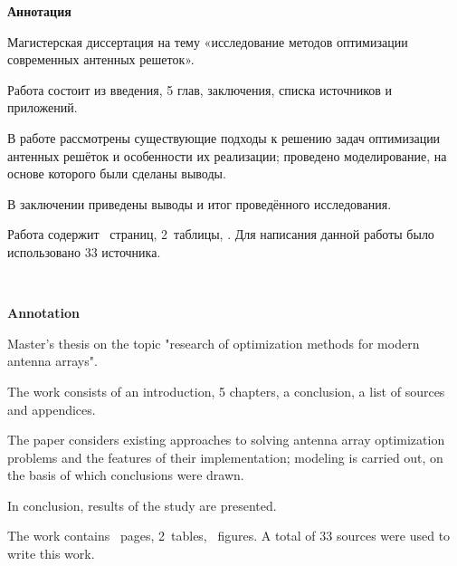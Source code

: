 {\Large\normalfont\bfseries \hfil Аннотация}
\vspace{1em}
\thispagestyle{empty}

Магистерская диссертация на тему «исследование методов оптимизации современных антенных решеток».

Работа состоит из введения, 5 глав, заключения, списка источников и приложений.

В работе рассмотрены существующие подходы к решению задач оптимизации антенных решёток и 
особенности их реализации; проведено моделирование, на основе которого были сделаны выводы.

В заключении приведены выводы и итог проведённого исследования.

Работа содержит~\pageref*{LastPage} страниц, 2~таблицы, \printtotfig.
Для написания данной работы было использовано 33 источника. 

\ 

{\Large\normalfont\bfseries \hfil Annotation}
\vspace{1em}
\thispagestyle{empty}

Master's thesis on the topic "research of optimization methods for modern antenna arrays".

The work consists of an introduction, 5 chapters, a conclusion, a list of sources and appendices.

The paper considers existing approaches to solving antenna array optimization problems and the features of
their implementation; modeling is carried out, on the basis of which conclusions were drawn.

In conclusion, results of the study are presented.

The work contains~\pageref*{LastPage} pages, 2~tables, \totalfigures~figures. 
A total of 33 sources were used to write this work.
